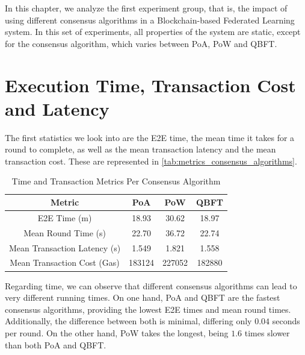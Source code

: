 In this chapter, we analyze the first experiment group, that is, the impact of using different consensus algorithms in a Blockchain-based Federated Learning system. In this set of experiments, all properties of the system are static, except for the consensus algorithm, which varies between PoA, PoW and QBFT.

\section{Execution Time, Transaction Cost and Latency}

The first statistics we look into are the E2E time, the mean time it takes for a round to complete, as well as the mean transaction latency and the mean transaction cost. These are represented in \autoref{tab:metrics_consensus_algorithms}.

\begin{table}[!ht]
\centering
\begin{tabular}{c|c|c|c} \hline \hline
Metric                              & PoA    & PoW    & QBFT   \\ \hline \hline
E2E Time (m)            & 18.93  & 30.62  & 18.97  \\ \hline
Mean Round Time (s)             & 22.70  & 36.72  & 22.74  \\ \hline
Mean Transaction Latency (s)    & 1.549  & 1.821  & 1.558  \\ \hline
Mean Transaction Cost (Gas)     & 183124 & 227052 & 182880 \\ \hline
\end{tabular}
\caption{Time and Transaction Metrics Per Consensus Algorithm}
\label{tab:metrics_consensus_algorithms}
\end{table}

Regarding time, we can observe that different consensus algorithms can lead to very different running times. On one hand, PoA and QBFT are the fastest consensus algorithms, providing the lowest E2E times and mean round times. Additionally, the difference between both is minimal, differing only $0.04$ seconds per round. On the other hand, PoW takes the longest, being $1.6$ times slower than both PoA and QBFT.

